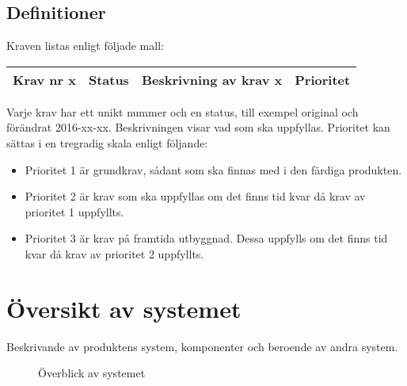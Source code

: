 \documentclass[11pt]{article}
\begin{document}
\begin{flushleft}
\subsection{Definitioner}
Kraven listas enligt följade mall:

\begin{center}
\begin{longtable}{|l|l|p{.65\linewidth}|l|} \hline
Krav nr x & 
Status &
Beskrivning av krav x &
Prioritet \\ \hline
\end{longtable}
\end{center}

Varje krav har ett unikt nummer och en status, till exempel original och förändrat 2016-xx-xx. Beskrivningen visar vad som ska uppfyllas. Prioritet kan sättas i en tregradig skala enligt följande:


\pagebreak
\begin{itemize}
  \item Prioritet 1 är grundkrav, sådant som ska finnas med i den färdiga produkten.
  \item Prioritet 2 är krav som ska uppfyllas om det finns tid kvar då krav av prioritet 1 uppfyllts.
  \item Prioritet 3 är krav på framtida utbyggnad. Dessa uppfylls om det finns tid kvar då krav av prioritet 2 uppfyllts.
\end{itemize}


\pagebreak
\section{Översikt av systemet}
Beskrivande av produktens system, komponenter och beroende av andra system.

\begin{figure}[htbp]
\centering
{}
\caption{Överblick av systemet}
\end{figure}


\end{flushleft}
\end{document}
